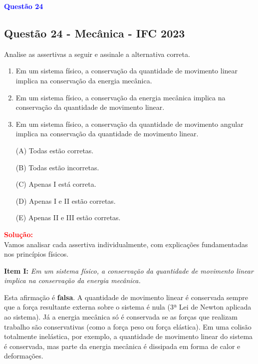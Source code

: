 \documentclass[a4paper,12pt]{article}
\begin{document}
\begin{flushleft}
\textbf{\textcolor{blue}{\Large Quest\~ao 24 }}\\
\noindent
\subsection{Quest\~ao 24 - Mecânica - IFC 2023}
Analise as assertivas a seguir e assinale a alternativa correta.

\begin{enumerate}
    \item Em um sistema físico, a conservação da quantidade de movimento linear implica na conservação da energia mecânica.
    \item Em um sistema físico, a conservação da energia mecânica implica na conservação da quantidade de movimento linear.
    \item Em um sistema físico, a conservação da quantidade de movimento angular implica na conservação da quantidade de movimento linear.
\end{enumerate}

\begin{itemize}
\item[(A)] Todas estão corretas.
\item[(B)] Todas estão incorretas.
\item[(C)] Apenas I está correta.
\item[(D)] Apenas I e II estão corretas.
\item[(E)] Apenas II e III estão corretas.
\end{itemize}

\vspace{0.5cm}

\textcolor{red}{\textbf{Solução:}}\\

Vamos analisar cada assertiva individualmente, com explicações fundamentadas nos princípios físicos.

\vspace{0.3cm}

\textbf{Item I:} \textit{Em um sistema físico, a conservação da quantidade de movimento linear implica na conservação da energia mecânica.}

Esta afirmação é \textbf{falsa}.  
A quantidade de movimento linear é conservada sempre que a força resultante externa sobre o sistema é nula (3ª Lei de Newton aplicada ao sistema).  
Já a energia mecânica só é conservada se as forças que realizam trabalho são conservativas (como a força peso ou força elástica).  
Em uma colisão totalmente inelástica, por exemplo, a quantidade de movimento linear do sistema é conservada, mas parte da energia mecânica é dissipada em forma de calor e deformações.


\end{flushleft}
\end{document}
